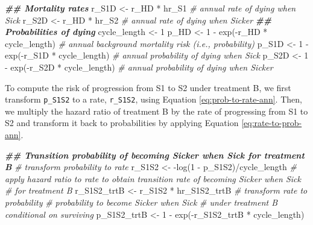 \documentclass[
]{article}
\newenvironment{Shaded}{\begin{snugshade}}{\end{snugshade}}
\newcommand{\CommentTok}[1]{\textcolor[rgb]{0.56,0.35,0.01}{\textit{#1}}}
\newcommand{\DecValTok}[1]{\textcolor[rgb]{0.00,0.00,0.81}{#1}}
\newcommand{\DocumentationTok}[1]{\textcolor[rgb]{0.56,0.35,0.01}{\textbf{\textit{#1}}}}
\newcommand{\FunctionTok}[1]{\textcolor[rgb]{0.00,0.00,0.00}{#1}}
\newcommand{\NormalTok}[1]{#1}
\newcommand{\OtherTok}[1]{\textcolor[rgb]{0.56,0.35,0.01}{#1}}
\newcommand{\SpecialCharTok}[1]{\textcolor[rgb]{0.00,0.00,0.00}{#1}}
\begin{document}
\begin{Shaded}
\begin{Highlighting}[]
\DocumentationTok{\#\# Mortality rates}
\NormalTok{r\_S1D }\OtherTok{\textless{}{-}}\NormalTok{ r\_HD }\SpecialCharTok{*}\NormalTok{ hr\_S1 }\CommentTok{\# annual rate of dying when Sick}
\NormalTok{r\_S2D }\OtherTok{\textless{}{-}}\NormalTok{ r\_HD }\SpecialCharTok{*}\NormalTok{ hr\_S2 }\CommentTok{\# annual rate of dying when Sicker}
\DocumentationTok{\#\# Probabilities of dying}
\NormalTok{cycle\_length }\OtherTok{\textless{}{-}} \DecValTok{1}
\NormalTok{p\_HD  }\OtherTok{\textless{}{-}} \DecValTok{1} \SpecialCharTok{{-}} \FunctionTok{exp}\NormalTok{(}\SpecialCharTok{{-}}\NormalTok{r\_HD }\SpecialCharTok{*}\NormalTok{ cycle\_length)  }\CommentTok{\# annual background mortality risk (i.e., probability)}
\NormalTok{p\_S1D }\OtherTok{\textless{}{-}} \DecValTok{1} \SpecialCharTok{{-}} \FunctionTok{exp}\NormalTok{(}\SpecialCharTok{{-}}\NormalTok{r\_S1D }\SpecialCharTok{*}\NormalTok{ cycle\_length) }\CommentTok{\# annual probability of dying when Sick}
\NormalTok{p\_S2D }\OtherTok{\textless{}{-}} \DecValTok{1} \SpecialCharTok{{-}} \FunctionTok{exp}\NormalTok{(}\SpecialCharTok{{-}}\NormalTok{r\_S2D }\SpecialCharTok{*}\NormalTok{ cycle\_length) }\CommentTok{\# annual probability of dying when Sicker}
\end{Highlighting}
\end{Shaded}

To compute the risk of progression from S1 to S2 under treatment B, we first transform \texttt{p\_S1S2} to a rate, \texttt{r\_S1S2}, using Equation \eqref{eq:prob-to-rate-ann}. Then, we multiply the hazard ratio of treatment B by the rate of progressing from S1 to S2 and transform it back to probabilities by applying Equation \eqref{eq:rate-to-prob-ann}.

\begin{Shaded}
\begin{Highlighting}[]
\DocumentationTok{\#\# Transition probability of becoming Sicker when Sick for treatment B}
\CommentTok{\# transform probability to rate}
\NormalTok{r\_S1S2 }\OtherTok{\textless{}{-}} \SpecialCharTok{{-}}\FunctionTok{log}\NormalTok{(}\DecValTok{1} \SpecialCharTok{{-}}\NormalTok{ p\_S1S2)}\SpecialCharTok{/}\NormalTok{cycle\_length}
\CommentTok{\# apply hazard ratio to rate to obtain transition rate of becoming Sicker when Sick }
\CommentTok{\# for treatment B}
\NormalTok{r\_S1S2\_trtB }\OtherTok{\textless{}{-}}\NormalTok{ r\_S1S2 }\SpecialCharTok{*}\NormalTok{ hr\_S1S2\_trtB}
\CommentTok{\# transform rate to probability}
\CommentTok{\# probability to become Sicker when Sick }
\CommentTok{\# under treatment B conditional on surviving}
\NormalTok{p\_S1S2\_trtB }\OtherTok{\textless{}{-}} \DecValTok{1} \SpecialCharTok{{-}} \FunctionTok{exp}\NormalTok{(}\SpecialCharTok{{-}}\NormalTok{r\_S1S2\_trtB }\SpecialCharTok{*}\NormalTok{ cycle\_length) }
\end{Highlighting}
\end{Shaded}
\end{document}
